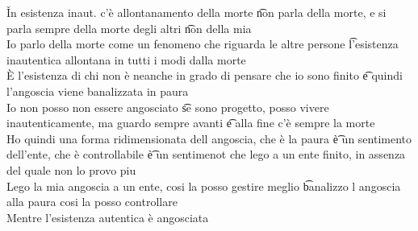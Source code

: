 \documentclass[12pt]{article}
\begin{document}
\v

In esistenza inaut. c'è allontanamento della morte \t non parla della morte, e si parla sempre della morte degli altri \t non della mia \\
Io parlo della morte come un fenomeno che riguarda le altre persone \t l'esistenza inautentica allontana in tutti i modi dalla morte \\
È l'esistenza di chi non è neanche in grado di pensare che io sono finito \t e quindi l'angoscia viene banalizzata in paura \\
Io non posso non essere angosciato \t se sono progetto, posso vivere inautenticamente, ma guardo sempre avanti \t e alla fine c'è sempre la morte \\
Ho quindi una forma ridimensionata dell angoscia, che è la paura \t è un sentimento dell'ente, che è controllabile \t è un sentimenot che lego a un ente finito, in assenza del quale non lo provo piu \\
Lego la mia angoscia a un ente, cosi la posso gestire meglio \t banalizzo l angoscia alla paura cosi la posso controllare \\
Mentre l'esistenza autentica è angosciata
\end{document}
